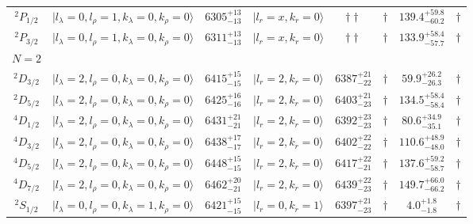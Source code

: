 \begin{tabular}{c| c c c c c c c}
$^{2}P_{1/2}$ & $\vert l_{\lambda}\!\!=\!0, l_{\rho}\!\!=\!1, k_{\lambda}\!\!=\!0, k_{\rho}\!\!=\!0 \rangle$ & $6305^{+13}_{-13}$ & $\vert l_r\!\!=\!x, k_r\!\!=\!0 \rangle$ & $\dagger\dagger$ & $\dagger$ & $139.4^{+59.8}_{-60.2}$ & $\dagger$ \\ 
$^{2}P_{3/2}$ & $\vert l_{\lambda}\!\!=\!0, l_{\rho}\!\!=\!1, k_{\lambda}\!\!=\!0, k_{\rho}\!\!=\!0 \rangle$ & $6311^{+13}_{-13}$ & $\vert l_r\!\!=\!x, k_r\!\!=\!0 \rangle$ & $\dagger\dagger$ & $\dagger$ & $133.9^{+58.4}_{-57.7}$ & $\dagger$ \\ 
\hline
 $N=2$  &  &  &  &  &  \\ 
$^{2}D_{3/2}$ & $\vert l_{\lambda}\!\!=\!2, l_{\rho}\!\!=\!0, k_{\lambda}\!\!=\!0, k_{\rho}\!\!=\!0 \rangle$ & $6415^{+15}_{-15}$ & $\vert l_r\!\!=\!2, k_r\!\!=\!0 \rangle$ & $6387^{+21}_{-22}$ & $\dagger$ & $59.9^{+26.2}_{-26.3}$ & $\dagger$ \\ 
$^{2}D_{5/2}$ & $\vert l_{\lambda}\!\!=\!2, l_{\rho}\!\!=\!0, k_{\lambda}\!\!=\!0, k_{\rho}\!\!=\!0 \rangle$ & $6425^{+16}_{-16}$ & $\vert l_r\!\!=\!2, k_r\!\!=\!0 \rangle$ & $6403^{+21}_{-23}$ & $\dagger$ & $134.5^{+58.4}_{-58.4}$ & $\dagger$ \\ 
$^{4}D_{1/2}$ & $\vert l_{\lambda}\!\!=\!2, l_{\rho}\!\!=\!0, k_{\lambda}\!\!=\!0, k_{\rho}\!\!=\!0 \rangle$ & $6431^{+21}_{-21}$ & $\vert l_r\!\!=\!2, k_r\!\!=\!0 \rangle$ & $6392^{+23}_{-23}$ & $\dagger$ & $80.6^{+34.9}_{-35.1}$ & $\dagger$ \\ 
$^{4}D_{3/2}$ & $\vert l_{\lambda}\!\!=\!2, l_{\rho}\!\!=\!0, k_{\lambda}\!\!=\!0, k_{\rho}\!\!=\!0 \rangle$ & $6438^{+17}_{-17}$ & $\vert l_r\!\!=\!2, k_r\!\!=\!0 \rangle$ & $6402^{+22}_{-22}$ & $\dagger$ & $110.6^{+48.9}_{-48.0}$ & $\dagger$ \\ 
$^{4}D_{5/2}$ & $\vert l_{\lambda}\!\!=\!2, l_{\rho}\!\!=\!0, k_{\lambda}\!\!=\!0, k_{\rho}\!\!=\!0 \rangle$ & $6448^{+15}_{-15}$ & $\vert l_r\!\!=\!2, k_r\!\!=\!0 \rangle$ & $6417^{+22}_{-21}$ & $\dagger$ & $137.6^{+59.2}_{-58.7}$ & $\dagger$ \\ 
$^{4}D_{7/2}$ & $\vert l_{\lambda}\!\!=\!2, l_{\rho}\!\!=\!0, k_{\lambda}\!\!=\!0, k_{\rho}\!\!=\!0 \rangle$ & $6462^{+20}_{-21}$ & $\vert l_r\!\!=\!2, k_r\!\!=\!0 \rangle$ & $6439^{+22}_{-23}$ & $\dagger$ & $149.7^{+66.0}_{-66.2}$ & $\dagger$ \\ 
$^{2}S_{1/2}$ & $\vert l_{\lambda}\!\!=\!0, l_{\rho}\!\!=\!0, k_{\lambda}\!\!=\!1, k_{\rho}\!\!=\!0 \rangle$ & $6421^{+15}_{-15}$ & $\vert l_r\!\!=\!0, k_r\!\!=\!1 \rangle$ & $6397^{+21}_{-23}$ & $\dagger$ & $4.0^{+1.8}_{-1.8}$ & $\dagger$ \\ 

\end{tabular}
